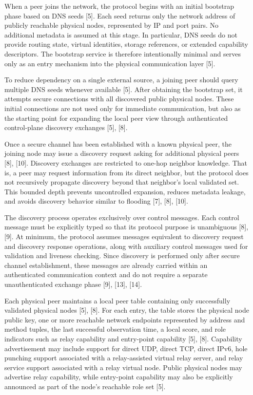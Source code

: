 \documentclass[12pt,a4paper]{article}
\begin{document}
When a peer joins the network, the protocol begins with an initial bootstrap phase based on DNS seeds [5]. Each seed returns only the network address of publicly reachable physical nodes, represented by IP and port pairs. No additional metadata is assumed at this stage. In particular, DNS seeds do not provide routing state, virtual identities, storage references, or extended capability descriptors. The bootstrap service is therefore intentionally minimal and serves only as an entry mechanism into the physical communication layer [5].

To reduce dependency on a single external source, a joining peer should query multiple DNS seeds whenever available [5]. After obtaining the bootstrap set, it attempts secure connections with all discovered public physical nodes. These initial connections are not used only for immediate communication, but also as the starting point for expanding the local peer view through authenticated control-plane discovery exchanges [5], [8].

Once a secure channel has been established with a known physical peer, the joining node may issue a discovery request asking for additional physical peers [8], [10]. Discovery exchanges are restricted to one-hop neighbor knowledge. That is, a peer may request information from its direct neighbor, but the protocol does not recursively propagate discovery beyond that neighbor's local validated set. This bounded depth prevents uncontrolled expansion, reduces metadata leakage, and avoids discovery behavior similar to flooding [7], [8], [10].

The discovery process operates exclusively over control messages. Each control message must be explicitly typed so that its protocol purpose is unambiguous [8], [9]. At minimum, the protocol assumes messages equivalent to discovery request and discovery response operations, along with auxiliary control messages used for validation and liveness checking. Since discovery is performed only after secure channel establishment, these messages are already carried within an authenticated communication context and do not require a separate unauthenticated exchange phase [9], [13], [14].

Each physical peer maintains a local peer table containing only successfully validated physical nodes [5], [8]. For each entry, the table stores the physical node public key, one or more reachable network endpoints represented by address and method tuples, the last successful observation time, a local score, and role indicators such as relay capability and entry-point capability [5], [8]. Capability advertisement may include support for direct UDP, direct TCP, direct IPv6, hole punching support associated with a relay-assisted virtual relay server, and relay service support associated with a relay virtual node. Public physical nodes may advertise relay capability, while entry-point capability may also be explicitly announced as part of the node's reachable role set [5].
\end{document}
